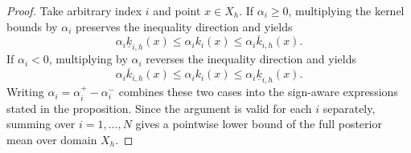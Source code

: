 \documentclass[10pt,a4paper]{amsart}
\begin{document}
\begin{proof}
Take arbitrary index $i$ and point $x\in X_h$. If $\alpha_i\ge0$, multiplying the kernel bounds by $\alpha_i$ preserves the inequality direction and yields
\[
\alpha_i\underline{k}_{i,h}(x)\le \alpha_i k_i(x)\le \alpha_i\overline{k}_{i,h}(x).
\]
If $\alpha_i<0$, multiplying by $\alpha_i$ reverses the inequality direction and yields
\[
\alpha_i\overline{k}_{i,h}(x)\le \alpha_i k_i(x)\le \alpha_i\underline{k}_{i,h}(x).
\]
Writing $\alpha_i=\alpha_i^+-\alpha_i^-$ combines these two cases into the sign-aware expressions stated in the proposition. Since the argument is valid for each $i$ separately, summing over $i=1,\ldots,N$ gives a pointwise lower bound of the full posterior mean over domain $X_h$.
\end{proof}
\end{document}
